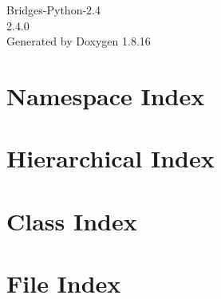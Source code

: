\let\mypdfximage\pdfximage\def\pdfximage{\immediate\mypdfximage}\documentclass[twoside]{book}
\newcommand{\+}{\discretionary{\mbox{\scriptsize$\hookleftarrow$}}{}{}}
\newcommand{\clearemptydoublepage}{%
  \newpage{\pagestyle{empty}\cleardoublepage}%
}
\begin{document}
\hypersetup{pageanchor=false,
             bookmarksnumbered=true,
             pdfencoding=unicode
            }
\begin{titlepage}
\vspace*{7cm}
\begin{center}%
{\Large Bridges-\/\+Python-\/2.4 \\[1ex]\large 2.\+4.\+0 }\\
\vspace*{1cm}
{\large Generated by Doxygen 1.8.16}\\
\end{center}
\end{titlepage}
\clearemptydoublepage
{}
\tableofcontents
\clearemptydoublepage
{}
\hypersetup{pageanchor=true}

\chapter{Namespace Index}

\chapter{Hierarchical Index}

\chapter{Class Index}

\chapter{File Index}

\end{document}
